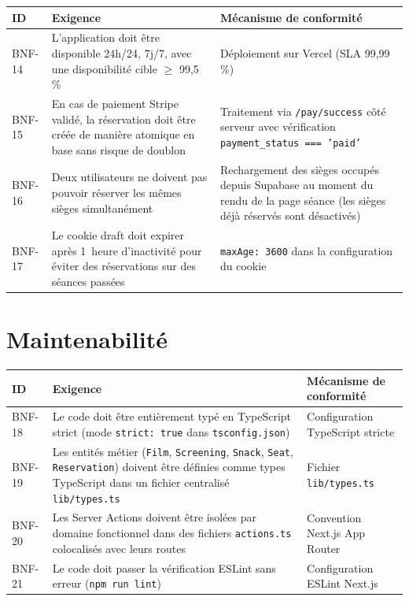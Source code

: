 \documentclass[12pt,a4paper,openany]{report}
\begin{document}
\begin{longtable}{p{1.2cm}p{8cm}p{3.5cm}}
  \toprule
  \textbf{ID} & \textbf{Exigence} & \textbf{Mécanisme de conformité} \\
  \midrule
  \endhead
  \bottomrule
  \endfoot

  BNF-14 & L'application doit être disponible 24h/24, 7j/7, avec une disponibilité cible $\geq$ 99,5\,\% & Déploiement sur Vercel (SLA 99,99\,\%) \\[4pt]

  BNF-15 & En cas de paiement Stripe validé, la réservation doit être créée de manière atomique en base sans risque de doublon & Traitement via \texttt{/pay/success} côté serveur avec vérification \texttt{payment\_status === 'paid'} \\[4pt]

  BNF-16 & Deux utilisateurs ne doivent pas pouvoir réserver les mêmes sièges simultanément & Rechargement des sièges occupés depuis Supabase au moment du rendu de la page séance (les sièges déjà réservés sont désactivés) \\[4pt]

  BNF-17 & Le cookie draft doit expirer après 1~heure d'inactivité pour éviter des réservations sur des séances passées & \texttt{maxAge: 3600} dans la configuration du cookie \\
\end{longtable}

\section{Maintenabilité}

\begin{longtable}{p{1.2cm}p{8cm}p{3.5cm}}
  \toprule
  \textbf{ID} & \textbf{Exigence} & \textbf{Mécanisme de conformité} \\
  \midrule
  \endhead
  \bottomrule
  \endfoot

  BNF-18 & Le code doit être entièrement typé en TypeScript strict (mode \texttt{strict: true} dans \texttt{tsconfig.json}) & Configuration TypeScript stricte \\[4pt]

  BNF-19 & Les entités métier (\texttt{Film}, \texttt{Screening}, \texttt{Snack}, \texttt{Seat}, \texttt{Reservation}) doivent être définies comme types TypeScript dans un fichier centralisé \texttt{lib/types.ts} & Fichier \texttt{lib/types.ts} \\[4pt]

  BNF-20 & Les Server Actions doivent être isolées par domaine fonctionnel dans des fichiers \texttt{actions.ts} colocalisés avec leurs routes & Convention Next.js App Router \\[4pt]

  BNF-21 & Le code doit passer la vérification ESLint sans erreur (\texttt{npm run lint}) & Configuration ESLint Next.js \\
\end{longtable}
\end{document}
